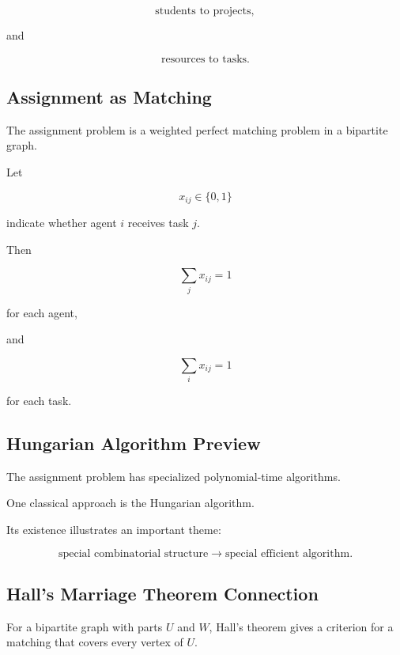 \[
\boxed{
\text{students to projects},
}
\]

and

\[
\boxed{
\text{resources to tasks}.
}
\]

\subsection{Assignment as Matching}
\label{subsec:assignment-as-matching}

The assignment problem is a weighted perfect matching problem in a
bipartite graph.

Let

\[
x_{ij}\in\{0,1\}
\]

indicate whether agent \(i\) receives task \(j\).

Then

\[
\boxed{
\sum_jx_{ij}=1
}
\]

for each agent,

and

\[
\boxed{
\sum_ix_{ij}=1
}
\]

for each task.

\subsection{Hungarian Algorithm Preview}
\label{subsec:hungarian-algorithm-preview}

The assignment problem has specialized polynomial-time algorithms.

One classical approach is the Hungarian algorithm.

Its existence illustrates an important theme:

\[
\boxed{
\text{special combinatorial structure}
\rightarrow
\text{special efficient algorithm}.
}
\]

\subsection{Hall's Marriage Theorem Connection}
\label{subsec:hall-matching-connection}

For a bipartite graph with parts \(U\) and \(W\), Hall's theorem gives a
criterion for a matching that covers every vertex of \(U\).

